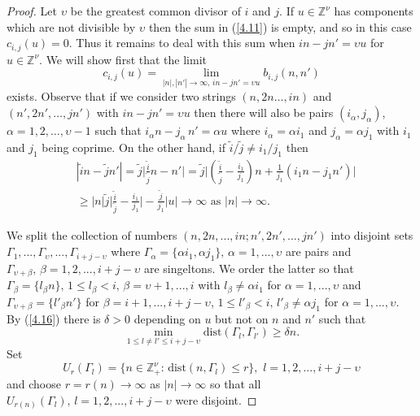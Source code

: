 \begin{proof} 
Let ${{\upsilon}}$ be the greatest common divisor of $i$ and $j$. If
 $u\in{{\mathbb Z}}^\nu$ has components which are not divisible by ${{\upsilon}}$ then the sum
 in (\ref{4.11}) is empty, and so in this case $c_{i,j}(u)=0$. Thus it
 remains to deal with this sum when $in-jn'={{\upsilon}} u$ for $u\in{{\mathbb Z}}^\nu$. 
 We will show first that the limit
\begin{equation}\label{4.15}
c_{i,j}(u)=\lim_{|n|,|n'|\to\infty,\, in-jn'={{\upsilon}} u}b_{i,j}(n,n')
\end{equation}
exists. Observe that if we consider two strings $(n, 2n \ldots, in)$ and
 $(n',2n',\ldots, jn')$ with $in-jn'={{\upsilon}} u$ then there will also be pairs
  $(i_\alpha, j_\alpha)$, $\alpha=1,2,\ldots, {{\upsilon}}-1$ such that $i_\alpha
  n-j_\alpha\,n'=\alpha  u$ where $i_{{\alpha}}={{\alpha}} i_1$ and $j_{{\alpha}}={{\alpha}} j_1$
  with $i_1$ and $j_1$ being coprime. On the other hand, if $\tilde i/
  \tilde j\ne i_1/j_1$ then 
 \begin{eqnarray}\label{4.16}
 &|\tilde in-\tilde jn'|=\tilde j\big\vert\frac {\tilde i}{\tilde j}n-
 n'\big\vert =\tilde j\big\vert (\frac {\tilde i}{\tilde j}-
\frac {i_1}{j_1})n+\frac 1{j_1}(i_1n-j_1n')\big\vert\\
&\geq |n|\tilde j\big\vert\frac {\tilde i}{\tilde j}-\frac {i_1}{j_1}\big\vert 
-\frac {\tilde j}{j_1}|u|\rightarrow\infty\,\,\mbox{as}\,\, |n|\to\infty.
\nonumber\end{eqnarray} 

We split the collection of numbers $(n,2n,...,in;n',2n',...,jn')$ into 
disjoint sets ${{\Gamma}}_1,...,{{\Gamma}}_{{\upsilon}},...,{{\Gamma}}_{i+j-{{\upsilon}}}$ where ${{\Gamma}}_{{\alpha}}=
\{{{\alpha}} i_1,{{\alpha}} j_1\},\,{{\alpha}}=1,...,{{\upsilon}}$ are pairs and ${{\Gamma}}_{{{\upsilon}}+{{\beta}}},\,{{\beta}}=
1,2,...,i+j-{{\upsilon}}$ are singeltons. We order the latter so that ${{\Gamma}}_{{\beta}}=
\{ l_{{\beta}} n\},\, 1\leq l_{{\beta}} <i,\,{{\beta}}={{\upsilon}}+1,...,i$ with $l_{{\beta}}\ne{{\alpha}} i_1$
for ${{\alpha}}=1,...,{{\upsilon}}$ and ${{\Gamma}}_{{{\upsilon}}+{{\beta}}}=\{{l'}_{{\beta}} n'\}$ for ${{\beta}}=i+1,...,
i+j-{{\upsilon}}$, $1\leq {l'}_{{\beta}}<i,\, {l'}_{{\beta}}\ne{{\alpha}} j_1$ for ${{\alpha}}=1,...,{{\upsilon}}$.
By (\ref{4.16}) there is ${{\delta}}>0$ depending on $u$ but not on $n$ and $n'$
such that
\[
\min_{1\leq l\ne l'\leq i+j-{{\upsilon}}}\mbox{dist}({{\Gamma}}_l,{{\Gamma}}_{l'})\geq{{\delta}} n.
\]
Set
\[
U_r({{\Gamma}}_l)=\{ n\in{{\mathbb Z}}^\nu_+:\,\mbox{dist}(n,{{\Gamma}}_l)\leq r\},\,\, l=1,2,...,
i+j-{{\upsilon}}
\]
and choose $r=r(n)\to\infty$ as $|n|\to\infty$ so that all $U_{r(n)}({{\Gamma}}_l),\,
l=1,2,...,i+j-{{\upsilon}}$ were disjoint.


\end{proof}
